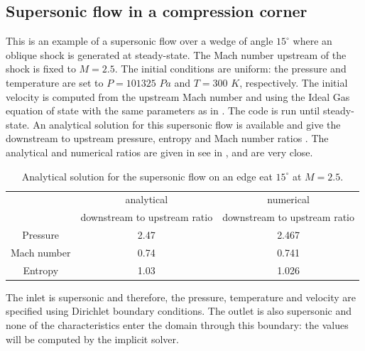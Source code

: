 \subsection{Supersonic flow in a compression corner} \label{sec:corner}
This is an example of a supersonic flow over a wedge of angle $15^{\circ}$ where an oblique shock is generated at steady-state. The Mach number upstream of the shock is fixed to $M=2.5$. The initial conditions are uniform: the pressure and temperature are set to $P=101325$ $Pa$ and $T=300$ $K$, respectively. The initial velocity is computed from the upstream Mach number and using the Ideal Gas equation of state with the same parameters as in . The code is run until steady-state. An analytical solution for this supersonic flow is available and give the downstream to upstream pressure, entropy and Mach number ratios \cite{CompressionCorner}. The analytical and numerical ratios are given in see in , and are very close. 
\begin{table}[H]
\begin{center}
 \caption{\label{tbl:corner_exact_sol} Analytical solution for the supersonic flow on an edge eat $15^{\circ}$ at $M=2.5$.}
 \begin{tabular}{|c|c|c|}
 \hline
   & analytical & numerical \\
    & downstream to upstream ratio & downstream to upstream ratio \\
 \hline
Pressure & 2.47 & 2.467\\
  \hline
Mach number  &  0.74 & 0.741\\
   \hline
  Entropy & 1.03 & 1.026\\ \hline 
\end{tabular}
\end{center}
\nonumber
\end{table}
The inlet is supersonic and therefore, the pressure, temperature and velocity are specified using Dirichlet boundary conditions. The outlet is also supersonic and none of the characteristics enter the domain through this boundary: the values will be computed by the implicit solver.
